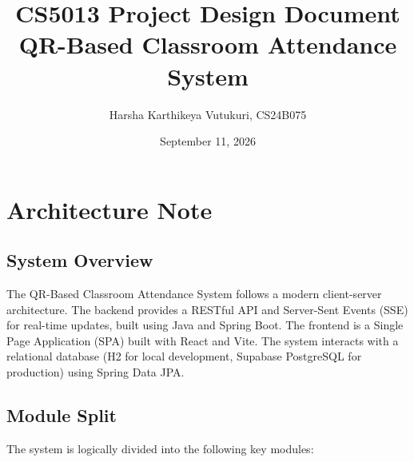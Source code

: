 \documentclass[11pt,a4paper]{article}
\title{\textbf{CS5013 Project Design Document}\\QR-Based Classroom Attendance System}
\author{Harsha Karthikeya Vutukuri, CS24B075}
\date{September 11, 2026}
\begin{document}
\maketitle

\section{Architecture Note}

\subsection{System Overview}
The QR-Based Classroom Attendance System follows a modern client-server architecture. The backend provides a RESTful API and Server-Sent Events (SSE) for real-time updates, built using Java and Spring Boot. The frontend is a Single Page Application (SPA) built with React and Vite. The system interacts with a relational database (H2 for local development, Supabase PostgreSQL for production) using Spring Data JPA.

\subsection{Module Split}
The system is logically divided into the following key modules:
\end{document}
